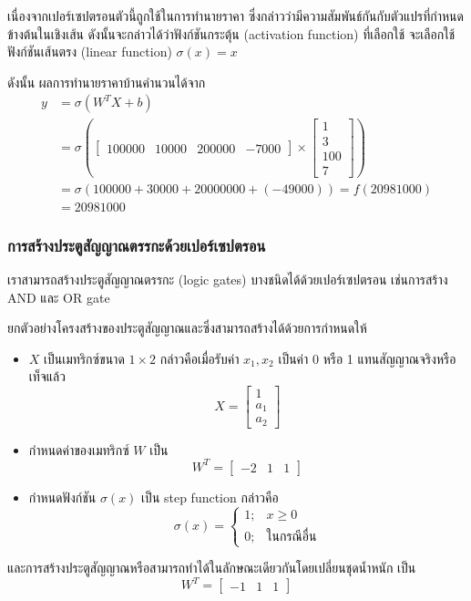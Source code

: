 เนื่องจากเปอร์เซปตรอนตัวนี้ถูกใช้ในการทำนายราคา ซึ่งกล่าวว่ามีความสัมพันธ์กันกับตัวแปรที่กำหนดข้างต้นในเชิงเส้น ดังนั้นจะกล่าวได้ว่าฟังก์ชันกระตุ้น (activation function) ที่เลือกใช้ จะเลือกใช้ฟังก์ชันเส้นตรง (linear function) $\sigma(x) = x$

ดังนั้น ผลการทำนายราคาบ้านคำนวนได้จาก
$$
    \begin{aligned}
        y &= \sigma\left(W^TX+b\right)\\
        &= \sigma\left(\begin{bmatrix}
            100000 & 10000 & 200000 & -7000
        \end{bmatrix} \times \begin{bmatrix}
            1 \\
            3 \\
            100 \\
            7
        \end{bmatrix}\right)\\
        &= \sigma(100000 + 30000 + 20000000 + (-49000)) = f(20981000)\\
        &= 20981000
    \end{aligned}
$$

\subsubsection{การสร้างประตูสัญญาณตรรกะด้วยเปอร์เซปตรอน}
เราสามารถสร้างประตูสัญญาณตรรกะ (logic gates) บางชนิดได้ด้วยเปอร์เซปตรอน เช่นการสร้าง AND และ OR gate

ยกตัวอย่างโครงสร้างของประตูสัญญาณและซึ่งสามารถสร้างได้ด้วยการกำหนดให้
\begin{itemize}
    \item $X$ เป็นเมทริกซ์ขนาด $1 \times 2$ กล่าวคือเมื่อรับค่า $x_1, x_2$ เป็นค่า 0 หรือ 1 แทนสัญญาณจริงหรือเท็จแล้ว
        $$X = \begin{bmatrix}
            1 \\
            a_1 \\
            a_2
        \end{bmatrix}$$
    \item กำหนดค่าของเมทริกซ์ $W$ เป็น
        $$W^T = \begin{bmatrix}
            -2 & 1 & 1
        \end{bmatrix}$$
    \item กำหนดฟังก์ชัน $\sigma(x)$ เป็น step function กล่าวคือ
    $$
        \sigma(x) = \begin{cases}
            1; & x \geq 0\\
            0; & \textrm{ในกรณีอื่น}
        \end{cases}
    $$
\end{itemize}
และการสร้างประตูสัญญาณหรือสามารถทำได้ในลักษณะเดียวกันโดยเปลี่ยนชุดน้ำหนัก เป็น
        $$W^T = \begin{bmatrix}
            -1 & 1 & 1
        \end{bmatrix}$$


